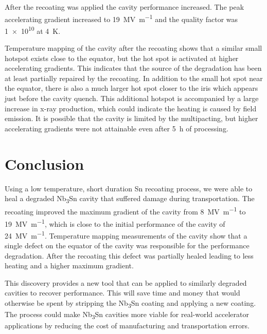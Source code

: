 \documentclass{revtex4-2}
\begin{document}
After the recoating was applied the cavity performance increased. The peak accelerating gradient increased to \qty{19}{\mega\volt\per\meter} and the quality factor was \num{1e10} at \qty{4}{\kelvin}.

Temperature mapping of the cavity after the recoating shows that a similar small hotspot exists close to the equator, but the hot spot is activated at higher accelerating gradients. This indicates that the source of the degradation has been at least partially repaired by the recoating. In addition to the small hot spot near the equator, there is also a much larger hot spot closer to the iris which appears just before the cavity quench. This additional hotspot is accompanied by a large increase in x-ray production, which could indicate the heating is caused by field emission. It is possible that the cavity is limited by the multipacting, but higher accelerating gradients were not attainable even after \qty{5}{\hour} of processing.










\section{Conclusion}
\label{sec:Conclusion}

Using a low temperature, short duration Sn recoating process, we were able to heal a degraded Nb\textsubscript{3}Sn cavity that suffered damage during transportation. The recoating improved the maximum gradient of the cavity from \qty{8}{\mega\volt\per\meter} to \qty{19}{\mega\volt\per\meter}, which is close to the initial performance of the cavity of \qty{24}{\mega\volt\per\meter}. Temperature mapping measurements of the cavity show that a single defect on the equator of the cavity was responsible for the performance degradation. After the recoating this defect was partially healed leading to less heating and a higher maximum gradient.

This discovery provides a new tool that can be applied to similarly degraded cavities to recover performance. This will save time and money that would otherwise be spent by stripping the Nb\textsubscript{3}Sn coating and applying a new coating. The process could make Nb\textsubscript{3}Sn cavities more viable for real-world accelerator applications by reducing the cost of manufacturing and transportation errors.





\end{document}
